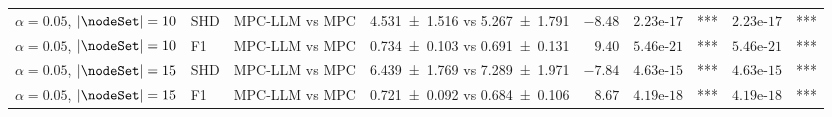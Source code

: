 \begin{table}[t]
{\begin{tabular}{ll l|c|r|rl|rl}
    \midrule
    $\alpha=0.05$, $|\nodeSet|=10$ & SHD & MPC-LLM vs MPC & \num{4.531 +- 1.516} vs \num{5.267 +- 1.791} & $-8.48$ & $2.23\text{e-}17$ & \!\!\!*** & $2.23\text{e-}17$ & \!\!\!*** \\
    $\alpha=0.05$, $|\nodeSet|=10$ & F1 & MPC-LLM vs MPC & \num{0.734 +- 0.103} vs \num{0.691 +- 0.131} & $9.40$ & $5.46\text{e-}21$ & \!\!\!*** & $5.46\text{e-}21$ & \!\!\!*** \\
    \midrule
    $\alpha=0.05$, $|\nodeSet|=15$ & SHD & MPC-LLM vs MPC & \num{6.439 +- 1.769} vs \num{7.289 +- 1.971} & $-7.84$ & $4.63\text{e-}15$ & \!\!\!*** & $4.63\text{e-}15$ & \!\!\!*** \\
    $\alpha=0.05$, $|\nodeSet|=15$ & F1 & MPC-LLM vs MPC & \num{0.721 +- 0.092} vs \num{0.684 +- 0.106} & $8.67$ & $4.19\text{e-}18$ & \!\!\!*** & $4.19\text{e-}18$ & \!\!\!*** \\
    \bottomrule
    \end{tabular}
    }
\end{table}
